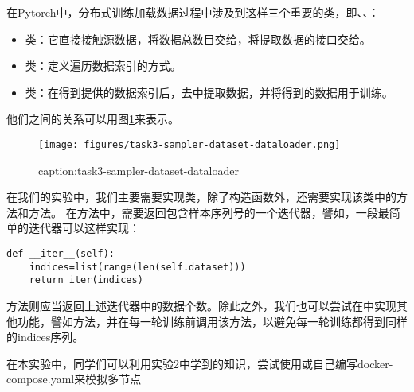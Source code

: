 在Pytorch中，分布式训练加载数据过程中涉及到这样三个重要的类，即、、：
\begin{itemize}
    \item {}类：它直接接触源数据，将数据总数目交给，将提取数据的接口交给。
    \item {}类：定义遍历数据索引的方式。
    \item {}类：在得到提供的数据索引后，去中提取数据，并将得到的数据用于训练。
\end{itemize}

他们之间的关系可以用图\ref{fig:task3-sampler-dataset-dataloader}来表示。
\begin{figure}[htbp]
	\centering
	\texttt{[image: figures/task3-sampler-dataset-dataloader.png]}
	\caption{caption:task3-sampler-dataset-dataloader}
	\label{fig:task3-sampler-dataset-dataloader}
\end{figure}

在我们的实验中，我们主要需要实现类，除了构造函数外，还需要实现该类中的方法和方法。
在方法中，需要返回包含样本序列号的一个迭代器，譬如，一段最简单的迭代器可以这样实现：
\begin{lstlisting}
def __iter__(self):
    indices=list(range(len(self.dataset)))
    return iter(indices)
\end{lstlisting}

方法则应当返回上述迭代器中的数据个数。除此之外，我们也可以尝试在中实现其他功能，譬如方法，并在每一轮训练前调用该方法，以避免每一轮训练都得到同样的indices序列。


在本实验中，同学们可以利用实验2中学到的知识，尝试使用或自己编写docker-compose.yaml来模拟多节点~

